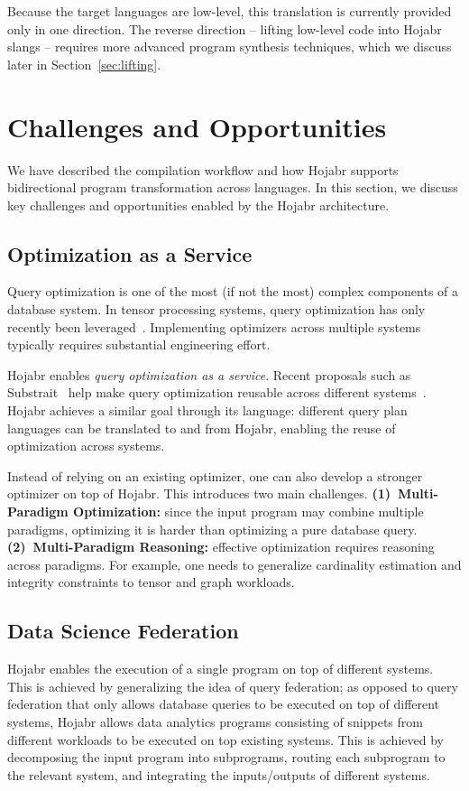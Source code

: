 \documentclass[sigconf,nonacm]{acmart}
\begin{document}
Because the target languages are low-level, this translation is currently provided only in one direction. The reverse direction -- lifting low-level code into Hojabr slangs -- requires more advanced program synthesis techniques, which we discuss later in Section~\ref{sec:lifting}.


\section{Challenges and Opportunities}
\label{sec:challenges}
We have described the compilation workflow and how Hojabr supports bidirectional program transformation across languages. 
In this section, we discuss key challenges and opportunities enabled by the Hojabr architecture.



\subsection{Optimization as a Service}
\label{sec:queryoptsas}
Query optimization is one of the most (if not the most) complex components of a database system. In tensor processing systems, query optimization has only recently been leveraged~\cite {deeds2025galley}. Implementing optimizers across multiple systems typically requires substantial engineering effort.

Hojabr enables \emph{query optimization as a service}. Recent proposals such as Substrait~\cite{nadeau2022substrait} help make query optimization reusable across different systems~\cite{pedreira2023composable,alotaibi2024towards}. Hojabr achieves a similar goal through its language: different query plan languages can be translated to and from Hojabr, enabling the reuse of optimization across systems.

Instead of relying on an existing optimizer, one can also develop a stronger optimizer on top of Hojabr. This introduces two main challenges. \textbf{(1)~Multi-Paradigm Optimization:} since the input program may combine multiple paradigms, optimizing it is harder than optimizing a pure database query. \textbf{(2)~Multi-Paradigm Reasoning:} effective optimization requires reasoning across paradigms. For example, one needs to generalize cardinality estimation and integrity constraints to tensor and graph workloads.


\subsection{Data Science Federation}
\label{sec:federation}
Hojabr enables the execution of a single program on top of different systems. This is achieved by generalizing the idea of query federation; as opposed to query federation that only allows database queries to be executed on top of different systems, Hojabr allows data analytics programs consisting of snippets from different workloads to be executed on top existing systems. This is achieved by decomposing the input program into subprograms, routing each subprogram to the relevant system, and integrating the inputs/outputs of different systems.
\end{document}
